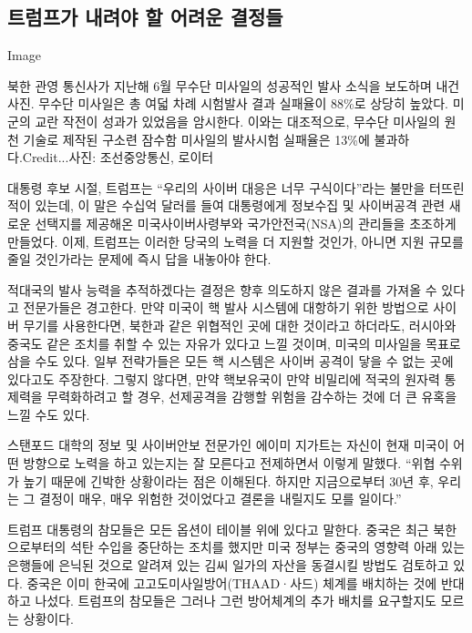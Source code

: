 \hypertarget{uxd2b8uxb7fcuxd504uxac00-uxb0b4uxb824uxc57c-uxd560-uxc5b4uxb824uxc6b4-uxacb0uxc815uxb4e4}{%
\subsection{트럼프가 내려야 할 어려운
결정들}\label{uxd2b8uxb7fcuxd504uxac00-uxb0b4uxb824uxc57c-uxd560-uxc5b4uxb824uxc6b4-uxacb0uxc815uxb4e4}}

Image

북한 관영 통신사가 지난해 6월 무수단 미사일의 성공적인 발사 소식을
보도하며 내건 사진. 무수단 미사일은 총 여덟 차례 시험발사 결과 실패율이
88\%로 상당히 높았다. 미군의 교란 작전이 성과가 있었음을 암시한다.
이와는 대조적으로, 무수단 미사일의 원천 기술로 제작된 구소련 잠수함
미사일의 발사시험 실패율은 13\%에 불과하다.Credit...사진: 조선중앙통신,
로이터

대통령 후보 시절, 트럼프는 ``우리의 사이버 대응은 너무 구식이다''라는
불만을 터뜨린 적이 있는데, 이 말은 수십억 달러를 들여 대통령에게
정보수집 및 사이버공격 관련 새로운 선택지를 제공해온 미국사이버사령부와
국가안전국(NSA)의 관리들을 초조하게 만들었다. 이제, 트럼프는 이러한
당국의 노력을 더 지원할 것인가, 아니면 지원 규모를 줄일 것인가라는
문제에 즉시 답을 내놓아야 한다.

적대국의 발사 능력을 추적하겠다는 결정은 향후 의도하지 않은 결과를
가져올 수 있다고 전문가들은 경고한다. 만약 미국이 핵 발사 시스템에
대항하기 위한 방법으로 사이버 무기를 사용한다면, 북한과 같은 위협적인
곳에 대한 것이라고 하더라도, 러시아와 중국도 같은 조치를 취할 수 있는
자유가 있다고 느낄 것이며, 미국의 미사일을 목표로 삼을 수도 있다. 일부
전략가들은 모든 핵 시스템은 사이버 공격이 닿을 수 없는 곳에 있다고도
주장한다. 그렇지 않다면, 만약 핵보유국이 만약 비밀리에 적국의 원자력
통제력을 무력화하려고 할 경우, 선제공격을 감행할 위험을 감수하는 것에 더
큰 유혹을 느낄 수도 있다.

스탠포드 대학의 정보 및 사이버안보 전문가인 에이미 지가트는 자신이 현재
미국이 어떤 방향으로 노력을 하고 있는지는 잘 모른다고 전제하면서 이렇게
말했다. ``위협 수위가 높기 때문에 긴박한 상황이라는 점은 이해된다.
하지만 지금으로부터 30년 후, 우리는 그 결정이 매우, 매우 위험한
것이었다고 결론을 내릴지도 모를 일이다.''

트럼프 대통령의 참모들은 모든 옵션이 테이블 위에 있다고 말한다. 중국은
최근 북한으로부터의 석탄 수입을 중단하는 조치를 했지만 미국 정부는
중국의 영향력 아래 있는 은행들에 은닉된 것으로 알려져 있는 김씨 일가의
자산을 동결시킬 방법도 검토하고 있다. 중국은 이미 한국에
고고도미사일방어(THAAD·사드) 체계를 배치하는 것에 반대하고 나섰다.
트럼프의 참모들은 그러나 그런 방어체계의 추가 배치를 요구할지도 모르는
상황이다.

